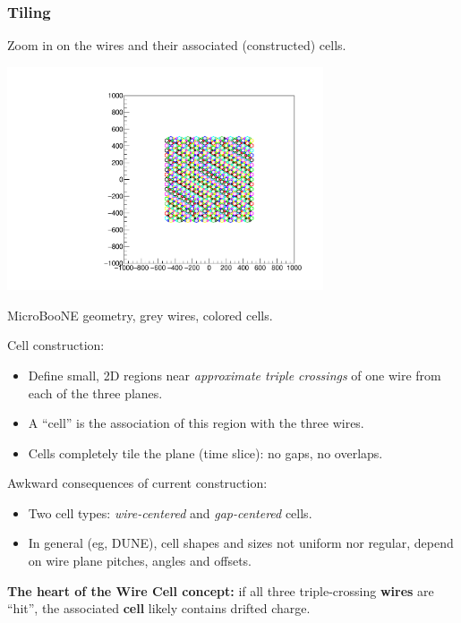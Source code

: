 \documentclass[xcolor=dvipsnames]{beamer}
\begin{document}
\begin{frame}[fragile]
  \frametitle{Tiling}

  \vspace{-10mm}

  \begin{center}
    \scriptsize Zoom in on the wires and their associated (constructed) cells.

    \includegraphics[width=0.7\textwidth,trim=8.6cm 10cm 8.6cm 9cm,clip]{test_boundcells.pdf}

    MicroBooNE geometry, grey wires, colored cells.
  \end{center}

  \footnotesize
  Cell construction:
  \begin{itemize}
  \item Define small, 2D regions near \textit{approximate triple crossings} of one wire from each of the three planes.
  \item A ``cell'' is the association of this region with the three wires. 
  \item Cells completely tile the plane (time slice): no gaps, no overlaps.
  \end{itemize}
  Awkward consequences of current construction:
  \begin{itemize}
  \item Two cell types: \textit{wire-centered} and \textit{gap-centered} cells.
  \item In general (eg, DUNE), cell shapes and sizes not uniform nor regular,
    depend on wire plane pitches, angles and offsets.
  \end{itemize}
  \textbf{The heart of the Wire Cell concept:} if all three
  triple-crossing \textbf{wires} are ``hit'', the associated \textbf{cell} likely
  contains drifted charge.

\end{frame}
\end{document}
